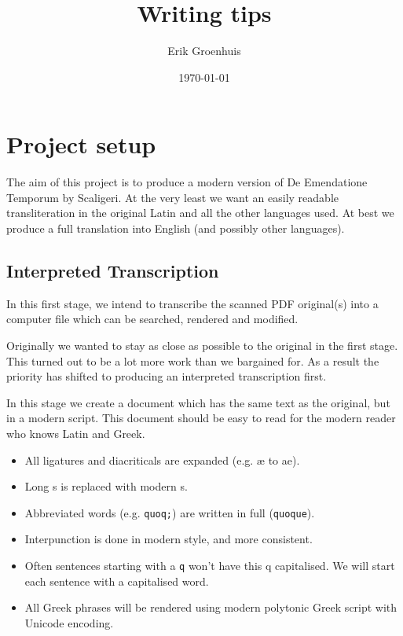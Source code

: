 \documentclass{report}
\title{Writing tips}
\author{Erik Groenhuis}
\date{\today}                                           %
\begin{document}
\maketitle

\tableofcontents{}




\chapter{Project setup}
The aim of this project is to produce a modern version of
De Emendatione Temporum by Scaligeri.
At the very least we want an easily readable transliteration
in the original Latin and all the other languages used.
At best we produce
a full translation into English (and possibly other languages).


\section{Interpreted Transcription}
In this first stage, we intend to transcribe the scanned PDF original(s)
into a computer file which can be searched, rendered
and modified.

Originally we wanted to stay as close as possible to the original
in the first stage.
This turned out to be a lot more work than we bargained for.
As a result the priority has shifted to producing
an interpreted transcription first.

In this stage we create a document which has the same text as the original,
but in a modern script.
This document should be easy to read for the modern reader who knows
Latin and Greek.

\begin{itemize}
\item All ligatures and diacriticals are expanded (e.g. æ to ae).
\item Long s is replaced with modern s.
\item Abbreviated words (e.g. \verb+quoq;+) are written in full (\verb+quoque+).
\item Interpunction is done in modern style, and more consistent.
\item Often sentences starting with a \verb+q+ won't have this q capitalised.
We will start each sentence with a capitalised word.
\item All Greek phrases will be rendered using modern polytonic Greek
script with Unicode encoding.
\end{itemize}
\end{document}
